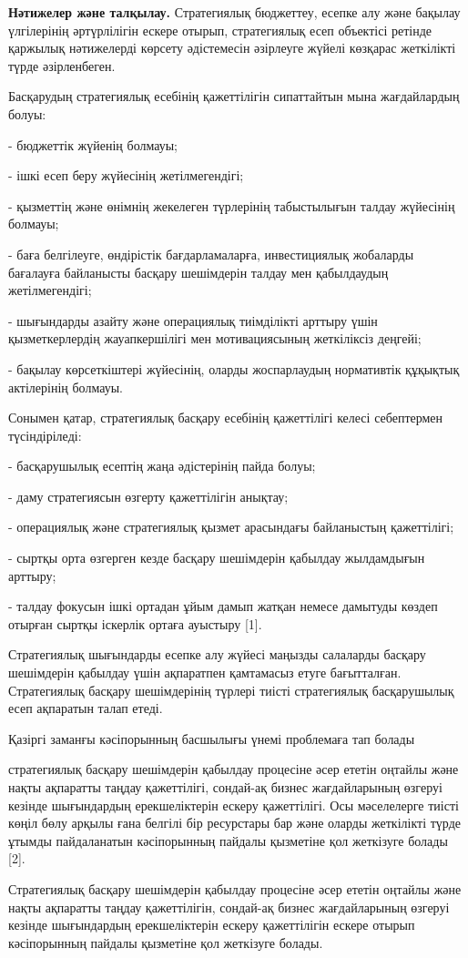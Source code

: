 \begin{multicols}{2}
{\bfseries Нәтижелер және талқылау.} Стратегиялық бюджеттеу, есепке алу
және бақылау үлгілерінің әртүрлілігін ескере отырып, стратегиялық есеп
объектісі ретінде қаржылық нәтижелерді көрсету әдістемесін әзірлеуге
жүйелі көзқарас жеткілікті түрде әзірленбеген.

Басқарудың стратегиялық есебінің қажеттілігін сипаттайтын мына
жағдайлардың болуы:

- бюджеттік жүйенің болмауы;

- ішкі есеп беру жүйесінің жетілмегендігі;

- қызметтің және өнімнің жекелеген түрлерінің табыстылығын талдау
жүйесінің болмауы;

- баға белгілеуге, өндірістік бағдарламаларға, инвестициялық жобаларды
бағалауға байланысты басқару шешімдерін талдау мен қабылдаудың
жетілмегендігі;

- шығындарды азайту және операциялық тиімділікті арттыру үшін
қызметкерлердің жауапкершілігі мен мотивациясының жеткіліксіз деңгейі;

- бақылау көрсеткіштері жүйесінің, оларды жоспарлаудың нормативтік
құқықтық актілерінің болмауы.

Сонымен қатар, стратегиялық басқару есебінің қажеттілігі келесі
себептермен түсіндіріледі:

- басқарушылық есептің жаңа әдістерінің пайда болуы;

- даму стратегиясын өзгерту қажеттілігін анықтау;

- операциялық және стратегиялық қызмет арасындағы байланыстың
қажеттілігі;

- сыртқы орта өзгерген кезде басқару шешімдерін қабылдау жылдамдығын
арттыру;

- талдау фокусын ішкі ортадан ұйым дамып жатқан немесе дамытуды көздеп
отырған сыртқы іскерлік ортаға ауыстыру {[}1{]}.

Стратегиялық шығындарды есепке алу жүйесі маңызды салаларды басқару
шешімдерін қабылдау үшін ақпаратпен қамтамасыз етуге бағытталған.
Стратегиялық басқару шешімдерінің түрлері тиісті стратегиялық
басқарушылық есеп ақпаратын талап етеді.

Қазіргі заманғы кәсіпорынның басшылығы үнемі проблемаға тап болады

стратегиялық басқару шешімдерін қабылдау процесіне әсер ететін оңтайлы
және нақты ақпаратты таңдау қажеттілігі, сондай-ақ бизнес жағдайларының
өзгеруі кезінде шығындардың ерекшеліктерін ескеру қажеттілігі. Осы
мәселелерге тиісті көңіл бөлу арқылы ғана белгілі бір ресурстары бар
және оларды жеткілікті түрде ұтымды пайдаланатын кәсіпорынның пайдалы
қызметіне қол жеткізуге болады {[}2{]}.

Стратегиялық басқару шешімдерін қабылдау процесіне әсер ететін оңтайлы
және нақты ақпаратты таңдау қажеттілігін, сондай-ақ бизнес жағдайларының
өзгеруі кезінде шығындардың ерекшеліктерін ескеру қажеттілігін ескере
отырып кәсіпорынның пайдалы қызметіне қол жеткізуге болады.
\end{multicols}

